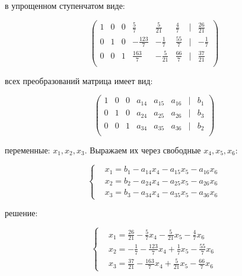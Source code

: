 \documentclass{report}
\begin{document}
\begin{itemize}
\begin{enumerate}
\begin{itemize}
	\end{itemize}
	
	\end{enumerate}
	
	\newpage
	
	 в упрощенном ступенчатом виде:
	
	
	\begin{center}
		\Large{
			\[
			\begin{pmatrix}
				1 & 0 & 0 & \frac{5}{7} & \frac{5}{21} & \frac{4}{7} & | & \frac{26}{21} \\
				0 & 1 & 0 & -\frac{123}{7} & -\frac{1}{7} & \frac{55}{7} & | & -\frac{1}{7} \\
				0 & 0 & 1 & \frac{163}{7} & -\frac{5}{21} & \frac{66}{7} & | & \frac{37}{21} \\
			\end{pmatrix}
			\]
		}
	\end{center}
	
	 всех преобразований матрица имеет вид:
	
	\begin{center}
		\Large{
			\[
			\begin{pmatrix}
				1 & 0 & 0 & a_{14} & a_{15} & a_{16} & | & b_{1} \\
				0 & 1 & 0 & a_{24} & a_{25} & a_{26} & | & b_{3} \\
				0 & 0 & 1 & a_{34} & a_{35} & a_{36} & | & b_{2} \\
			\end{pmatrix}
			\]
		}
	\end{center}
	
	
	 переменные: $x_1, x_2, x_3$. Выражаем их через свободные $x_4, x_5, x_6$:
	
	\[
	\left\{
	\begin{aligned}
		&x_1 = b_1 - a_{14}x_4 - a_{15}x_5 - a_{16}x_6 \\
		&x_2 = b_2 - a_{24}x_4 - a_{25}x_5 - a_{26}x_6 \\
		&x_3 = b_3 - a_{34}x_4 - a_{35}x_5 - a_{36}x_6
	\end{aligned}
	\right.
	\]
	
	
	 решение:
	
	\[
	\left\{
	\begin{aligned}
		&x_1 = \frac{26}{21} - \frac{5}{7}x_4 - \frac{5}{21}x_5 - \frac{4}{7}x_6 \\
		&x_2 = -\frac{1}{7} - \frac{123}{7}x_4 + \frac{1}{7}x_5 - \frac{55}{7}x_6 \\
		&x_3 = \frac{37}{21} - \frac{163}{7}x_4 + \frac{5}{21}x_5 - \frac{66}{7}x_6
	\end{aligned}
	\right.
	\]
		
\end{itemize}
\end{document}
